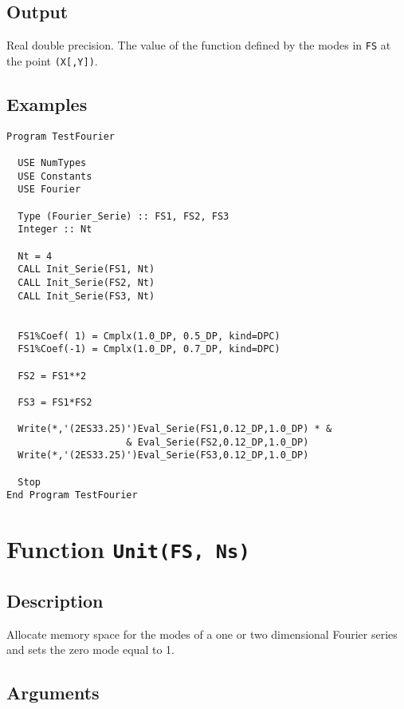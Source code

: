 \subsection{Output}

Real double precision. The value of the function defined by the modes
in \texttt{FS} at the point \texttt{(X[,Y])}.

\subsection{Examples}

\begin{lstlisting}[emph=Eval_Serie,
                   emphstyle=\color{blue},
                   frame=trBL,
                   caption=Evaluating a Fourier series at a point.,
                   label=eval_serie]
Program TestFourier

  USE NumTypes
  USE Constants
  USE Fourier

  Type (Fourier_Serie) :: FS1, FS2, FS3
  Integer :: Nt

  Nt = 4
  CALL Init_Serie(FS1, Nt)
  CALL Init_Serie(FS2, Nt)
  CALL Init_Serie(FS3, Nt)


  FS1%Coef( 1) = Cmplx(1.0_DP, 0.5_DP, kind=DPC)
  FS1%Coef(-1) = Cmplx(1.0_DP, 0.7_DP, kind=DPC)

  FS2 = FS1**2

  FS3 = FS1*FS2

  Write(*,'(2ES33.25)')Eval_Serie(FS1,0.12_DP,1.0_DP) * &
                     & Eval_Serie(FS2,0.12_DP,1.0_DP)
  Write(*,'(2ES33.25)')Eval_Serie(FS3,0.12_DP,1.0_DP)

  Stop
End Program TestFourier
\end{lstlisting}


\section{Function \texttt{Unit(FS, Ns)}}

\subsection{Description}

Allocate memory space for the modes of a one or two dimensional
Fourier series and sets the zero mode equal to 1.

\subsection{Arguments}

